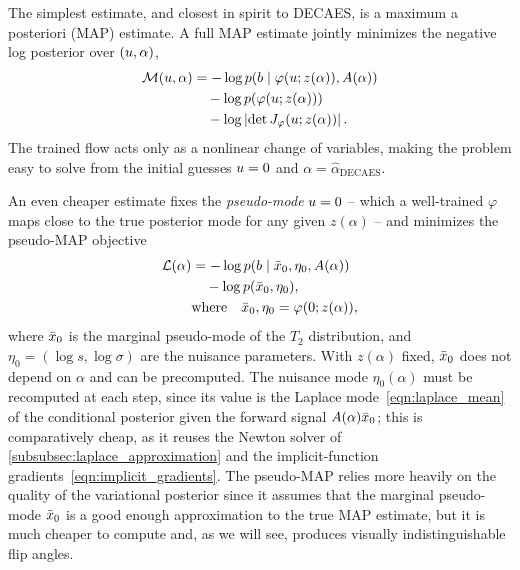 The simplest estimate, and closest in spirit to \gls*{DECAES}, is a maximum a posteriori (\gls*{MAP}) estimate.
A full \gls*{MAP} estimate jointly minimizes the negative log posterior over $(u, \alpha)$,
\begin{align}\label{eqn:apx:flip_angle_full_map}
    \mathcal{M}(u, \alpha) & = -\log p(b \mid \varphi(u; z(\alpha)), A(\alpha)) \nonumber \\
                                & \quad -\log p(\varphi(u; z(\alpha))) \nonumber                     \\
                                & \quad -\log \left| \det J_\varphi(u; z(\alpha)) \right|.
\end{align}
The trained flow acts only as a nonlinear change of variables, making the problem easy to solve from the initial guesses $u = 0$ and $\alpha = \hat{\alpha}_{\mathrm{DECAES}}$.

An even cheaper estimate fixes the \textit{pseudo-mode} $u = \mathrm{0}$ -- which a well-trained $\varphi$ maps close to the true posterior mode for any given $z(\alpha)$ -- and minimizes the pseudo-\gls*{MAP} objective
\begin{align}\label{eqn:apx:flip_angle_pseudo_map}
    \mathcal{L}(\alpha) & = -\log p(b \mid \bar{x}_0, \eta_0, A(\alpha)) \nonumber \\
                        & \quad -\log p(\bar{x}_0, \eta_0),                              \\
                        & \text{where} \quad
    \bar{x}_0, \eta_0 = \varphi(\mathrm{0}; z(\alpha)), \nonumber
\end{align}
where $\bar{x}_0$ is the marginal pseudo-mode of the $T_2$ distribution, and $\eta_0 = (\log s, \log \sigma)$ are the nuisance parameters.
With $z(\alpha)$ fixed, $\bar{x}_0$ does not depend on $\alpha$ and can be precomputed.
The nuisance mode $\eta_0(\alpha)$ must be recomputed at each step, since its value is the Laplace mode~\eqref{eqn:laplace_mean} of the conditional posterior given the forward signal $A(\alpha) \bar{x}_0$;
this is comparatively cheap, as it reuses the Newton solver of \cref{subsubsec:laplace_approximation} and the implicit-function gradients~\eqref{eqn:implicit_gradients}.
The pseudo-\gls*{MAP} relies more heavily on the quality of the variational posterior since it assumes that the marginal pseudo-mode $\bar{x}_0$ is a good enough approximation to the true \gls*{MAP} estimate, but it is much cheaper to compute and, as we will see, produces visually indistinguishable flip angles.

